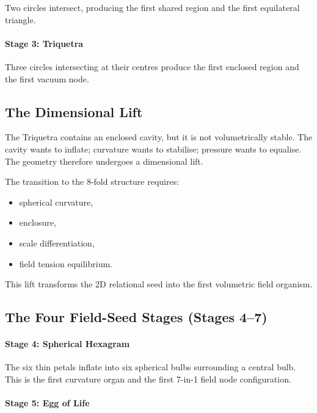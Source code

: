 Two circles intersect, producing the first shared region and the first equilateral triangle.

\paragraph{Stage 3: Triquetra}

Three circles intersecting at their centres produce the first enclosed region and the first vacuum node.

\subsection{The Dimensional Lift}

The Triquetra contains an enclosed cavity, but it is not volumetrically stable.  
The cavity wants to inflate; curvature wants to stabilise; pressure wants to equalise.  
The geometry therefore undergoes a dimensional lift.

The transition to the 8-fold structure requires:

\begin{itemize}
    \item spherical curvature,
    \item enclosure,
    \item scale differentiation,
    \item field tension equilibrium.
\end{itemize}

This lift transforms the 2D relational seed into the first volumetric field organism.

\subsection{The Four Field-Seed Stages (Stages 4–7)}

\paragraph{Stage 4: Spherical Hexagram}

The six thin petals inflate into six spherical bulbs surrounding a central bulb.  
This is the first curvature organ and the first 7-in-1 field node configuration.

\paragraph{Stage 5: Egg of Life}

